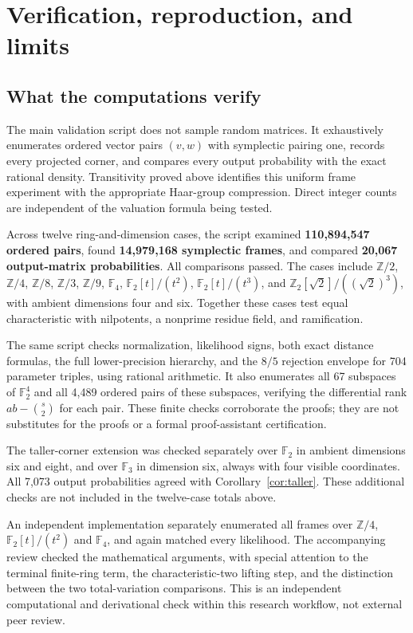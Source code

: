 \section{Verification, reproduction, and limits}
\label{sec:verification}

\subsection{What the computations verify}

The main validation script does not sample random matrices. It
exhaustively enumerates ordered vector pairs $(v,w)$ with symplectic
pairing one, records every projected corner, and compares every
output probability with the exact rational density. Transitivity
proved above identifies this uniform frame experiment with the
appropriate Haar-group compression. Direct integer counts are
independent of the valuation formula being tested.

Across twelve ring-and-dimension cases, the script examined
\textbf{110,894,547 ordered pairs}, found
\textbf{14,979,168 symplectic frames}, and compared
\textbf{20,067 output-matrix probabilities}. All comparisons passed.
The cases include $\mathbb Z/2$, $\mathbb Z/4$, $\mathbb Z/8$,
$\mathbb Z/3$, $\mathbb Z/9$, $\mathbb F_4$,
$\mathbb F_2[t]/(t^2)$, $\mathbb F_2[t]/(t^3)$, and
$\mathbb Z_2[\sqrt2]/((\sqrt2)^3)$, with ambient dimensions four
and six. Together these cases test equal characteristic with
nilpotents, a nonprime residue field, and ramification.

The same script checks normalization, likelihood signs, both exact
distance formulas, the full lower-precision hierarchy, and the
$8/5$ rejection envelope for 704 parameter triples, using rational
arithmetic. It also enumerates all 67 subspaces of $\mathbb F_2^4$
and all 4,489 ordered pairs of these subspaces, verifying the
differential rank $ab-\binom{s}{2}$ for each pair.
These finite checks corroborate the proofs; they are not substitutes
for the proofs or a formal proof-assistant certification.

The taller-corner extension was checked separately over $\mathbb F_2$
in ambient dimensions six and eight, and over $\mathbb F_3$ in dimension
six, always with four visible coordinates. All 7,073 output probabilities
agreed with Corollary~\ref{cor:taller}. These additional checks are not
included in the twelve-case totals above.

An independent implementation separately enumerated all frames
over $\mathbb Z/4$, $\mathbb F_2[t]/(t^2)$ and $\mathbb F_4$, and
again matched every likelihood. The accompanying review checked
the mathematical arguments, with special attention to the terminal
finite-ring term, the characteristic-two lifting step, and the
distinction between the two total-variation comparisons. This is
an independent computational and derivational check within this
research workflow, not external peer review.

